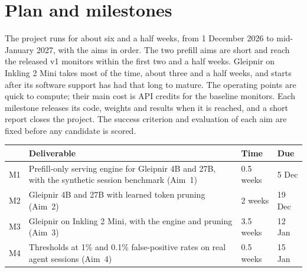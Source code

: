 \section{Plan and milestones}
\label{sec:plan}
The project runs for about six and a half weeks, from 1 December 2026 to
mid-January 2027, with the aims in order. The two prefill aims are short and
reach the released v1 monitors within the first two and a half weeks. Gleipnir
on Inkling 2 Mini takes most of the time, about three and a half weeks, and
starts after its software support has had that long to mature. The operating points are quick
to compute; their main cost is API credits for the baseline monitors. Each milestone releases its code,
weights and results when it is reached, and a short report closes the
project. The success criterion and evaluation of each aim are fixed before any
candidate is scored.

\begin{tabularx}{\linewidth}{@{}lXll@{}}
\toprule
 & Deliverable & Time & Due \\
\midrule
M1 & Prefill-only serving engine for Gleipnir 4B and 27B, with the synthetic
session benchmark (Aim~1) & 0.5 weeks & 5 Dec \\
M2 & Gleipnir 4B and 27B with learned token pruning (Aim~2) & 2 weeks & 19 Dec \\
M3 & Gleipnir on Inkling 2 Mini, with the engine and pruning (Aim~3) & 3.5 weeks & 12 Jan \\
M4 & Thresholds at 1\% and 0.1\% false-positive rates on real agent sessions
(Aim~4) & 0.5 weeks & 15 Jan \\
\bottomrule
\end{tabularx}
